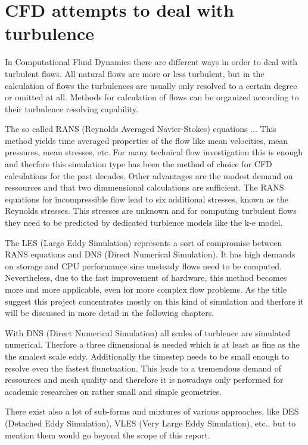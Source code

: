\section{CFD attempts to deal with turbulence}
In Computational Fluid Dynamics there are different ways in order to deal with turbulent flows. All natural flows are more or less turbulent, but in the calculation of flows the turbulences are usually only resolved to a certain degree or omitted at all. Methods for calculation of flows can be organized according to their turbulence resolving capability.

The so called RANS (Reynolds Averaged Navier-Stokes) equations ...
This method yields time averaged properties of the flow like mean velocities, mean pressures, mean stresses, etc. For many technical flow investigation this is enough and therfore this simulation type has been the method of choice for CFD calculations for the past decades. Other advantages are the modest demand on ressources and that two dimmensional calculations are sufficient.
The RANS equations for incompressible flow lead to six additional stresses, known as the Reynolds stresses. This stresses are unknown and for computing turbulent flows they need to be predicted by dedicated turblence models like the k-e model.

The LES (Large Eddy Simulation) represents a sort of compromise between RANS equations and DNS (Direct Numerical Simulation). It has high demands on storage and CPU performance sine unsteady flows need to be computed. Nevertheless, due to the fast improvement of hardware, this method becomes more and more applicable, even for more complex flow problems. As the title suggest this project concentrates mostly on this kind of simulation and therfore it will be discussed in more detail in the following chapters.

With DNS (Direct Numerical Simulation) all scales of turblence are simulated numerical. Therfore a three dimensional is needed which is at least as fine as the the smalest scale eddy. Additionally the timestep needs to be small enough to resolve even the fastest flunctuation. This leads to a tremendous demand of ressources and mesh quality and therefore it is nowadays only performed for academic researches on rather small and simple geometries.

There exist also a lot of sub-forms and mixtures of various approaches, like DES (Detached Eddy Simulation), VLES (Very Large Eddy Simulation), etc., but to mention them would go beyond the scope of this report.

